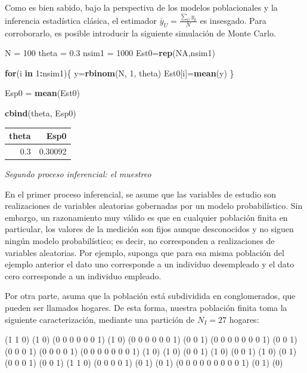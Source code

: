 \documentclass[
  spanish,
  12pt,
]{book}
\newenvironment{Shaded}{\begin{snugshade}}{\end{snugshade}}
\newcommand{\ConstantTok}[1]{\textcolor[rgb]{0.56,0.35,0.01}{#1}}
\newcommand{\ControlFlowTok}[1]{\textcolor[rgb]{0.13,0.29,0.53}{\textbf{#1}}}
\newcommand{\DecValTok}[1]{\textcolor[rgb]{0.00,0.00,0.81}{#1}}
\newcommand{\FloatTok}[1]{\textcolor[rgb]{0.00,0.00,0.81}{#1}}
\newcommand{\FunctionTok}[1]{\textcolor[rgb]{0.13,0.29,0.53}{\textbf{#1}}}
\newcommand{\NormalTok}[1]{#1}
\newcommand{\OtherTok}[1]{\textcolor[rgb]{0.56,0.35,0.01}{#1}}
\newcommand{\SpecialCharTok}[1]{\textcolor[rgb]{0.81,0.36,0.00}{\textbf{#1}}}
\begin{document}
Como es bien sabido, bajo la perspectiva de los modelos poblacionales y la inferencia estadística clásica, el estimador \(\bar{y}_U = \frac{\sum_U y_k}{N}\) es insesgado. Para corroborarlo, es posible introducir la siguiente simulación de Monte Carlo.

\begin{Shaded}
\begin{Highlighting}[]
\NormalTok{N }\OtherTok{=} \DecValTok{100}
\NormalTok{theta }\OtherTok{=} \FloatTok{0.3}
\NormalTok{nsim1 }\OtherTok{=} \DecValTok{1000}
\NormalTok{Est0}\OtherTok{=}\FunctionTok{rep}\NormalTok{(}\ConstantTok{NA}\NormalTok{,nsim1)}

\ControlFlowTok{for}\NormalTok{(i }\ControlFlowTok{in} \DecValTok{1}\SpecialCharTok{:}\NormalTok{nsim1)\{}
\NormalTok{y}\OtherTok{=}\FunctionTok{rbinom}\NormalTok{(N, }\DecValTok{1}\NormalTok{, theta)}
\NormalTok{Est0[i]}\OtherTok{=}\FunctionTok{mean}\NormalTok{(y)}
\NormalTok{\}}

\NormalTok{Esp0 }\OtherTok{=} \FunctionTok{mean}\NormalTok{(Est0)}

\FunctionTok{cbind}\NormalTok{(theta, Esp0)  }
\end{Highlighting}
\end{Shaded}

\begin{tabular}{r|r}
\hline
theta & Esp0\\
\hline
0.3 & 0.30092\\
\hline
\end{tabular}

\emph{Segundo proceso inferencial: el muestreo}

En el primer proceso inferencial, se asume que las variables de estudio son realizaciones de variables aleatorias gobernadas por un modelo probabilístico. Sin embargo, un razonamiento muy válido es que en cualquier población finita en particular, los valores de la medición son fijos aunque desconocidos y no siguen ningún modelo probabilístico;
es decir, no corresponden a realizaciones de variables aleatorias. Por ejemplo, suponga que para esa misma población del ejemplo anterior el dato uno corresponde a un individuo desempleado y el dato cero corresponde a un individuo empleado.

Por otra parte, asuma que la población está subdividida en conglomerados, que pueden ser llamados hogares. De esta forma, nuestra población finita toma la siguiente caracterización, mediante una partición de \(N_{I}=27\) hogares:

(1 1 0) (1 0) (0 0 0 0 0 0 1) (1 0) (0 0 0 0 0 0 1) (0 0
1) (0 0 0 0 0 0 0 1) (0 0 1) (0 0 0 1) (0 0 0 0 1) (0 0
0 0 0 0 0 1) (1 0) (1 0) (0 0 1) (1 0) (0 0 1) (1 0) (0 1)
(0 0 0 1) (0 0 1) (1 1 0) (0 0 0 0 1) (0 1) (0 1) (0 0 0 0
0 0 0 0 0 1) (0 1) (0)
\end{document}
